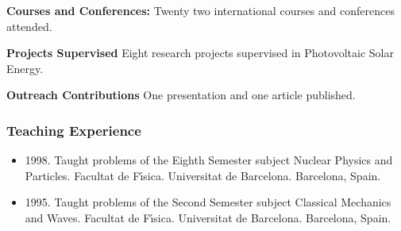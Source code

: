 \documentclass{article}
\begin{document}

\medskip
{\bf Courses and Conferences:}
%
Twenty two international courses and conferences attended.


\medskip
{\bf Projects Supervised}
%
Eight research projects supervised in Photovoltaic Solar Energy.


\medskip
{\bf Outreach Contributions}
%
One presentation and one article published.


\subsubsection*{Teaching Experience}

\begin{itemize}\itemsep 0pt
\item 1998. 
Taught problems of the Eighth Semester subject
Nuclear Physics and Particles. 
Facultat de F\'{\i}sica. 
Universitat de Barcelona. 
Barcelona, Spain.

\item 1995. 
Taught problems of the Second Semester subject 
Classical Mechanics and Waves. 
Facultat de F\'{\i}sica. 
Universitat de Barcelona. 
Barcelona, Spain.
\end{itemize}
\end{document}
